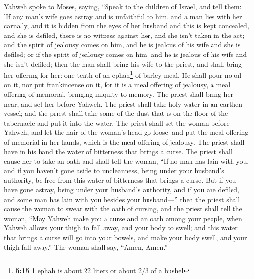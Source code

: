 Yahweh spoke to Moses, saying,  ``Speak
to the children of Israel, and tell them: 'If any man's wife goes astray
and is unfaithful to him,  and a man lies with her
carnally, and it is hidden from the eyes of her husband and this is kept
concealed, and she is defiled, there is no witness against her, and she
isn't taken in the act;  and the spirit of jealousy comes
on him, and he is jealous of his wife and she is defiled; or if the
spirit of jealousy comes on him, and he is jealous of his wife and she
isn't defiled;  then the man shall bring his wife to the
priest, and shall bring her offering for her: one tenth of an
ephah\footnote{\textbf{5:15} 1 ephah is about 22 liters or about 2/3 of
  a bushel} of barley meal. He shall pour no oil on it, nor put
frankincense on it, for it is a meal offering of jealousy, a meal
offering of memorial, bringing iniquity to memory.  The
priest shall bring her near, and set her before Yahweh. 
The priest shall take holy water in an earthen vessel; and the priest
shall take some of the dust that is on the floor of the tabernacle and
put it into the water.  The priest shall set the woman
before Yahweh, and let the hair of the woman's head go loose, and put
the meal offering of memorial in her hands, which is the meal offering
of jealousy. The priest shall have in his hand the water of bitterness
that brings a curse.  The priest shall cause her to take
an oath and shall tell the woman, ``If no man has lain with you, and if
you haven't gone aside to uncleanness, being under your husband's
authority, be free from this water of bitterness that brings a curse.
 But if you have gone astray, being under your husband's
authority, and if you are defiled, and some man has lain with you
besides your husband---''  then the priest shall cause
the woman to swear with the oath of cursing, and the priest shall tell
the woman, ``May Yahweh make you a curse and an oath among your people,
when Yahweh allows your thigh to fall away, and your body to swell;
 and this water that brings a curse will go into your
bowels, and make your body swell, and your thigh fall away.'' The woman
shall say, ``Amen, Amen.''

